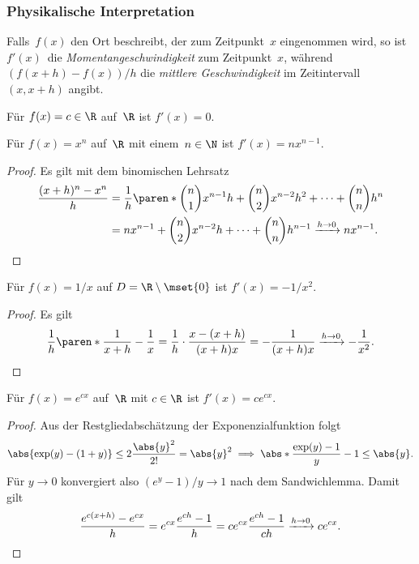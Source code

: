 \documentclass[a4paper]{article}
\begin{document}
\subsubsection{Physikalische Interpretation}

Falls~$f(x)$ den Ort beschreibt, der zum Zeitpunkt~$x$ eingenommen wird, so ist $f'(x)$~die \emph{Momentangeschwindigkeit} zum Zeitpunkt~$x$, während $(f(x+h)-f(x))/h$ die \emph{mittlere Geschwindigkeit} im Zeitintervall $(x,x+h)$ angibt.

\begin{proposition}
    Für $f(x) = c \in \R$ auf~$\R$ ist $f'(x) = 0$.
\end{proposition}

\begin{proposition}
    Für $f(x) = x^n$ auf~$\R$ mit einem~$n \in \N$ ist $f'(x) = nx^{n-1}$.
\end{proposition}

\begin{proof}
    Es gilt mit dem binomischen Lehrsatz
    \begin{align*}
        \frac{(x+h)^n-x^n}{h} &= \frac{1}{h} \paren*{\binom{n}{1}x^{n-1}h + \binom{n}{2}x^{n-2}h^2 + \dots + \binom{n}{n}h^n} \\
        &= nx^{n-1} + \binom{n}{2}x^{n-2}h + \dots + \binom{n}{n}h^{n-1} \xrightarrow{h\to0} nx^{n-1}. \qedhere
    \end{align*}
\end{proof}

\begin{proposition}
    Für $f(x) = 1/x$ auf $D = \R\setminus\mset{0}$ ist $f'(x) = -1/x^2$.
\end{proposition}

\begin{proof}
    Es gilt
    \begin{equation*}
        \frac{1}{h} \paren*{\frac{1}{x+h} - \frac{1}{x}} = \frac{1}{h} \cdot \frac{x-(x+h)}{(x+h)x} = -\frac{1}{(x+h)x} \xrightarrow{h\to0} -\frac{1}{x^2}. \qedhere
    \end{equation*}
\end{proof}

\begin{proposition}
    Für $f(x) = e^{cx}$ auf~$\R$ mit $c \in \R$ ist $f'(x) = ce^{cx}$.
\end{proposition}

\begin{proof}
    Aus der Restgliedabschätzung der Exponenzialfunktion folgt
    \begin{equation*}
        \abs{\exp(y)-(1+y)} \leq 2\frac{\abs{y}^2}{2!} = \abs{y}^2 \implies \abs*{\frac{\exp(y)-1}{y} - 1} \leq \abs{y}.
    \end{equation*}
    Für $y \to 0$ konvergiert also $(e^y-1)/y \to 1$ nach dem Sandwichlemma. Damit gilt
    \begin{equation*}
        \frac{e^{c(x+h)}-e^{cx}}{h} = e^{cx} \frac{e^{ch}-1}{h} = ce^{cx} \frac{e^{ch}-1}{ch} \xrightarrow{h\to0} ce^{cx}. \qedhere
    \end{equation*}
\end{proof}
\end{document}
